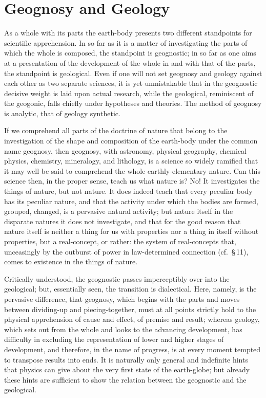 \documentclass[12pt]{book}
\begin{document}
\section{Geognosy and Geology}
\label{sec:16}

\noindent As a whole with its parts the earth-body presents two different standpoints
for scientific apprehension. In so far as it is a matter of investigating the parts of
which the whole is composed, the standpoint is geognostic; in so far as one aims at a
presentation of the development of the whole in and with that of the parts, the
standpoint is geological. Even if one will not set geognosy and geology against each
other as two separate sciences, it is yet unmistakable that in the geognostic decisive
weight is laid upon actual research, while the geological, reminiscent of the geogonic,
falls chiefly under hypotheses and theories. The method of geognosy is analytic, that
of geology synthetic.

If we comprehend all parts of the doctrine of nature that belong to the investigation
of the shape and composition of the earth-body under the common name geognosy, then
geognosy, with astronomy, physical geography, chemical physics, chemistry, mineralogy,
and lithology, is a science so widely ramified that it may well be said to comprehend
the whole earthly-elementary nature. Can this science then, in the proper sense, teach
us what nature is? No! It investigates the things of nature, but not nature. It does
indeed teach that every peculiar body has its peculiar nature, and that the activity
under which the bodies are formed, grouped, changed, is a pervasive natural activity;
but nature itself in the disparate natures it does not investigate, and that for the
good reason that nature itself is neither a thing for us with properties nor a thing in
itself without properties, but a real-concept, or rather: the system of real-concepts
that, unceasingly by the outburst of power in law-determined connection (cf.\ \S\,11),
comes to existence in the things of nature.

Critically understood, the geognostic passes imperceptibly over into the geological;
but, essentially seen, the transition is dialectical. Here, namely, is the pervasive
difference, that geognosy, which begins with the parts and moves between dividing-up and
piecing-together, must at all points strictly hold to the physical apprehension of cause
and effect, of premise and result; whereas geology, which sets out from the whole and
looks to the advancing development, has difficulty in excluding the representation of
lower and higher stages of development, and therefore, in the name of progress, is at
every moment tempted to transpose results into ends. It is naturally only general and
indefinite hints that physics can give about the very first state of the earth-globe;
but already these hints are sufficient to show the relation between the geognostic and
the geological.
\end{document}
